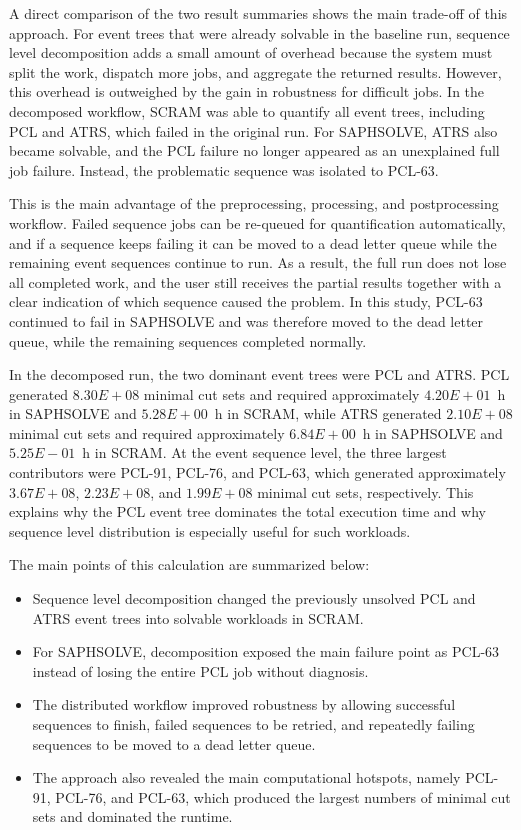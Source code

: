 

A direct comparison of the two result summaries shows the main trade-off of this approach. For event trees that were already solvable in the baseline run, sequence level decomposition adds a small amount of overhead because the system must split the work, dispatch more jobs, and aggregate the returned results. However, this overhead is outweighed by the gain in robustness for difficult jobs. In the decomposed workflow, SCRAM was able to quantify all event trees, including PCL and ATRS, which failed in the original run. For SAPHSOLVE, ATRS also became solvable, and the PCL failure no longer appeared as an unexplained full job failure. Instead, the problematic sequence was isolated to PCL-63.

This is the main advantage of the preprocessing, processing, and postprocessing workflow. Failed sequence jobs can be re-queued for quantification automatically, and if a sequence keeps failing it can be moved to a dead letter queue while the remaining event sequences continue to run. As a result, the full run does not lose all completed work, and the user still receives the partial results together with a clear indication of which sequence caused the problem. In this study, PCL-63 continued to fail in SAPHSOLVE and was therefore moved to the dead letter queue, while the remaining sequences completed normally.

In the decomposed run, the two dominant event trees were PCL and ATRS. PCL generated $8.30E+08$ minimal cut sets and required approximately $4.20E+01$~h in SAPHSOLVE and $5.28E+00$~h in SCRAM, while ATRS generated $2.10E+08$ minimal cut sets and required approximately $6.84E+00$~h in SAPHSOLVE and $5.25E-01$~h in SCRAM. At the event sequence level, the three largest contributors were PCL-91, PCL-76, and PCL-63, which generated approximately $3.67E+08$, $2.23E+08$, and $1.99E+08$ minimal cut sets, respectively. This explains why the PCL event tree dominates the total execution time and why sequence level distribution is especially useful for such workloads.

The main points of this calculation are summarized below:
\begin{itemize}
    \item Sequence level decomposition changed the previously unsolved PCL and ATRS event trees into solvable workloads in SCRAM.
    \item For SAPHSOLVE, decomposition exposed the main failure point as PCL-63 instead of losing the entire PCL job without diagnosis.
    \item The distributed workflow improved robustness by allowing successful sequences to finish, failed sequences to be retried, and repeatedly failing sequences to be moved to a dead letter queue.
    \item The approach also revealed the main computational hotspots, namely PCL-91, PCL-76, and PCL-63, which produced the largest numbers of minimal cut sets and dominated the runtime.
\end{itemize}

